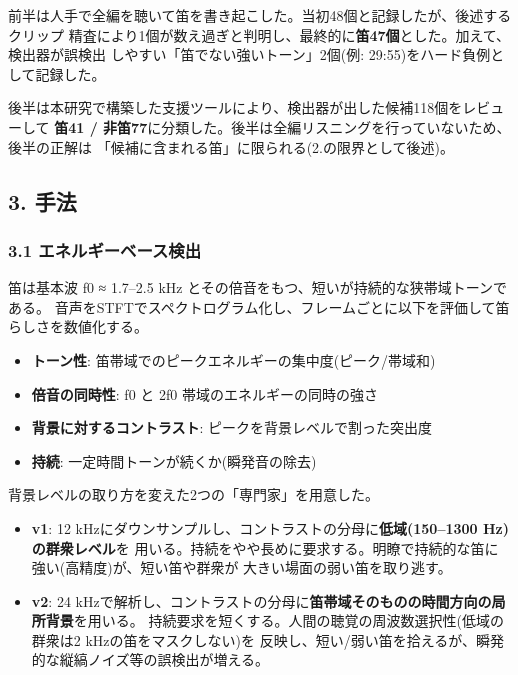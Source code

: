 \documentclass[
  japanese,
]{ltjsarticle}
\providecommand{\tightlist}{%
  \setlength{\itemsep}{0pt}\setlength{\parskip}{0pt}}
\begin{document}
前半は人手で全編を聴いて笛を書き起こした。当初48個と記録したが、後述するクリップ
精査により1個が数え過ぎと判明し、最終的に\textbf{笛47個}とした。加えて、検出器が誤検出
しやすい「笛でない強いトーン」2個(例: 29:55)をハード負例として記録した。

後半は本研究で構築した支援ツールにより、検出器が出した候補118個をレビューして
\textbf{笛41 /
非笛77}に分類した。後半は全編リスニングを行っていないため、後半の正解は
「候補に含まれる笛」に限られる(2.の限界として後述)。

\subsection{3. 手法}\label{ux624bux6cd5}

\subsubsection{3.1
エネルギーベース検出}\label{ux30a8ux30cdux30ebux30aeux30fcux30d9ux30fcux30b9ux691cux51fa}

笛は基本波 f0 ≈ 1.7--2.5 kHz
とその倍音をもつ、短いが持続的な狭帯域トーンである。
音声をSTFTでスペクトログラム化し、フレームごとに以下を評価して笛らしさを数値化する。

\begin{itemize}
\tightlist
\item
  \textbf{トーン性}: 笛帯域でのピークエネルギーの集中度(ピーク/帯域和)
\item
  \textbf{倍音の同時性}: f0 と 2f0 帯域のエネルギーの同時の強さ
\item
  \textbf{背景に対するコントラスト}: ピークを背景レベルで割った突出度
\item
  \textbf{持続}: 一定時間トーンが続くか(瞬発音の除去)
\end{itemize}

背景レベルの取り方を変えた2つの「専門家」を用意した。

\begin{itemize}
\tightlist
\item
  \textbf{v1}: 12
  kHzにダウンサンプルし、コントラストの分母に\textbf{低域(150--1300
  Hz)の群衆レベル}を
  用いる。持続をやや長めに要求する。明瞭で持続的な笛に強い(高精度)が、短い笛や群衆が
  大きい場面の弱い笛を取り逃す。
\item
  \textbf{v2}: 24
  kHzで解析し、コントラストの分母に\textbf{笛帯域そのものの時間方向の局所背景}を用いる。
  持続要求を短くする。人間の聴覚の周波数選択性(低域の群衆は2
  kHzの笛をマスクしない)を
  反映し、短い/弱い笛を拾えるが、瞬発的な縦縞ノイズ等の誤検出が増える。
\end{itemize}
\end{document}
